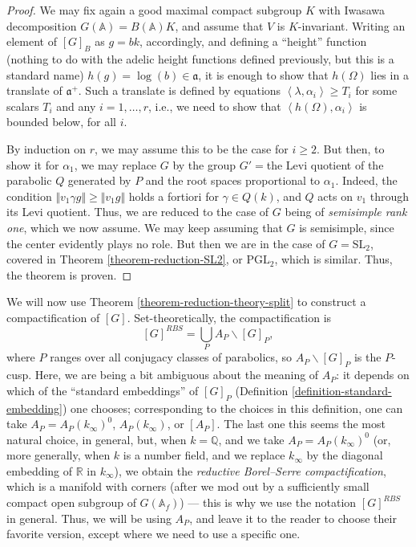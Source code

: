 \begin{proof}
 We may fix again a good maximal compact subgroup $K$ with Iwasawa decomposition $G(\mathbb A) = B(\mathbb A)K$, and assume that $V$ is $K$-invariant. Writing an element of $[G]_B$ as $g=bk$, accordingly, and defining a ``height'' function (nothing to do with the adelic height functions defined previously, but this is a standard name) $h(g) = \log(b)\in \mathfrak a$, it is enough to show that $h(\Omega)$ lies in a translate of $\mathfrak a^+$. Such a translate is defined by equations $\left < \lambda, \alpha_i\right> \ge T_i$ for some scalars $T_i$ and any $i=1,\dots ,r$, i.e., we need to show that $\left< h(\Omega), \alpha_i\right>$ is bounded below, for all $i$. 
 
 By induction on $r$, we may assume this to be the case for $i \ge 2$. But then, to show it for $\alpha_1$, we may replace $G$ by the group $G'=$the Levi quotient of the parabolic $Q$ generated by $P$ and the root spaces proportional to $\alpha_1$. Indeed, the condition $\Vert v_1 \gamma g \Vert \ge \Vert v_1 g\Vert$ holds a fortiori for $\gamma \in Q (k)$, and $Q$ acts on $v_1$ through its Levi quotient. Thus, we are reduced to the case of $G$ being of \emph{semisimple rank one}, which we now assume. We may keep assuming that $G$ is semisimple, since the center evidently plays no role. But then we are in the case of $G = \text{SL}_2$, covered in Theorem \ref{theorem-reduction-SL2}, or $\text{PGL}_2$, which is similar. Thus, the theorem is proven. 
\end{proof}

We will now use Theorem \ref{theorem-reduction-theory-split} to construct a compactification of $[G]$. Set-theoretically, the compactification is
$$ {[G]}^{RBS} = \bigcup_P A_P\backslash [G]_P,$$
where $P$ ranges over all conjugacy classes of parabolics, so $A_P\backslash [G]_P$ is the $P$-cusp. Here, we are being a bit ambiguous about the meaning of $A_P$: it depends on which of the ``standard embeddings''  of $[G]_P$ (Definition \ref{definition-standard-embedding}) one chooses; corresponding to the choices in this definition, one can take $A_P = A_P(k_\infty)^0$, $A_P(k_\infty)$, or $[A_P]$. The last one this seems the most natural choice, in general, but, when $k = \mathbb Q$, and we take $A_P = A_P(k_\infty)^0$ (or, more generally, when $k$ is a number field, and we replace $k_\infty$ by the diagonal embedding of $\mathbb R$ in $k_\infty$), we obtain the \emph{reductive Borel--Serre compactification}, which is a manifold with corners (after we mod out by a sufficiently small compact open subgroup of $G(\mathbb A_f)$) --- this is why we use the notation ${[G]}^{RBS}$ in general. Thus, we will be using $A_P$, and leave it to the reader to choose their favorite version, except where we need to use a specific one.


